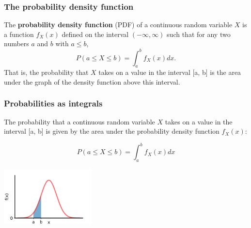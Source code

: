 \documentclass[9pt]{beamer}
\begin{document}
\begin{frame}
\frametitle{The probability density function}

\begin{definition} 
The \textbf{probability density function} (PDF) of a continuous random variable $X$ is a function $f_X(x)$ defined on the interval $(-\infty, \infty)$ such that for any two numbers $a$ and
$b$ with $a \leq b$,
\begin{equation*}
P(a \leq X \leq b) = \int_a^b f_X(x) dx.
\end{equation*} 
That is, the probability that $X$ takes on a value in the interval [a, b] is the area under the graph of the density function above this interval.
\end{definition}

\vspace{0.3cm}


\end{frame}

\begin{frame}
\frametitle{Probabilities as integrals}

The probability that a continuous random variable $X$ takes on a value in the interval [a, b] is given by the area under the probability density function $f_X(x)$:

\vspace{-0cm}

\begin{equation*}
P(a \leq X \leq b) = \int_a^b f_X(x) dx
\end{equation*}

\vspace{-0.2cm}
\begin{center}
\includegraphics[height=3cm]{images/normal_area.png}
\end{center}

\end{frame}
\end{document}
